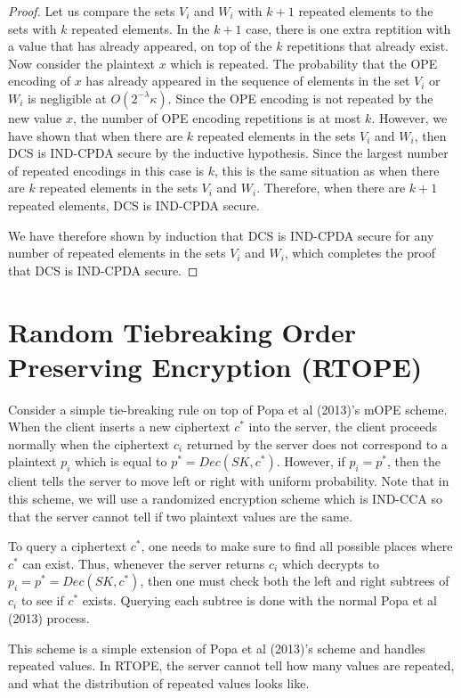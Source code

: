 \documentclass[12pt]{article}
\begin{document}
\begin{proof}
Let us compare the sets $V_i$ and $W_i$ with $k+1$ repeated elements to the sets with $k$ repeated elements. In the $k+1$ case, there is one extra reptition with a value that has already appeared, on top of the $k$ repetitions that already exist. Now consider the plaintext $x$ which is repeated. The probability that the OPE encoding of $x$ has already appeared in the sequence of elements in the set $V_i$ or $W_i$ is negligible at $O(2^{-\lambda} \kappa)$. Since the OPE encoding is not repeated by the new value $x$, the number of OPE encoding repetitions is at most $k$. However, we have shown that when there are $k$ repeated elements in the sets $V_i$ and $W_i$, then DCS is IND-CPDA secure by the inductive hypothesis. Since the largest number of repeated encodings in this case is $k$, this is the same situation as when there are $k$ repeated elements in the sets $V_i$ and $W_i$. Therefore, when there are $k+1$ repeated elements, DCS is IND-CPDA secure.

We have therefore shown by induction that DCS is IND-CPDA secure for any number of repeated elements in the sets $V_i$ and $W_i$, which completes the proof that DCS is IND-CPDA secure.
\end{proof}

\section{Random Tiebreaking Order Preserving Encryption (RTOPE)}

  Consider a simple tie-breaking rule on top of Popa et al (2013)'s mOPE scheme. When the client inserts a new ciphertext $c^*$ into the server, the client proceeds normally when the ciphertext $c_i$ returned by the server does not correspond to a plaintext $p_i$ which is equal to $p^* = Dec(SK, c^*)$. However, if $p_i = p^*$, then the client tells the server to move left or right with uniform probability. Note that in this scheme, we will use a randomized encryption scheme which is IND-CCA so that the server cannot tell if two plaintext values are the same.

  To query a ciphertext $c^*$, one needs to make sure to find all possible places where $c^*$ can exist. Thus, whenever the server returns $c_i$ which decrypts to $p_i = p^* = Dec(SK, c^*)$, then one must check both the left and right subtrees of $c_i$ to see if $c^*$ exists. Querying each subtree is done with the  normal Popa et al (2013) process.

  This scheme is a simple extension of Popa et al (2013)'s scheme and handles repeated values. In RTOPE, the server cannot tell how many values are repeated, and what the distribution of repeated values looks like.
\end{document}
